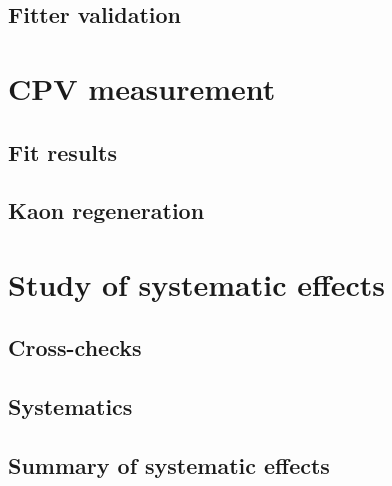 \subsection{Fitter validation}
\label{sec:measurement_of_sin2beta:likelihood_fit:validation}
\section{CPV measurement}
\label{sec:measurement_of_sin2beta:cpv_measurement}
\subsection{Fit results}
\label{sec:measurement_of_sin2beta:cpv_measurement:results}
\subsection{Kaon regeneration}
\section{Study of systematic effects}
\label{sec:measurement_of_sin2beta:systematics}
\subsection{Cross-checks}
\label{sec:measurement_of_sin2beta:systematics:cross_checks}
\subsection{Systematics}
\label{sec:measurement_of_sin2beta:systematics:systematics}
\subsection{Summary of systematic effects}
\label{sec:measurement_of_sin2beta:systematics:summary}
